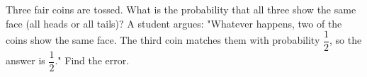 Three fair coins are tossed. What is the probability that all three show the same face (all heads or all tails)? A student argues: "Whatever happens, two of the coins show the same face. The third coin matches them with probability $\dfrac{1}{2}$, so the answer is $\dfrac{1}{2}$." Find the error.
